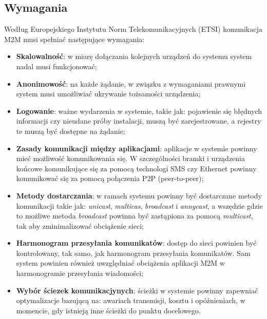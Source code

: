 \documentclass[12pt, a4paper, twoside]{report}
\begin{document}
\subsection{Wymagania}
\hspace{1cm}Według Europejskiego Instytutu Norm Telekomunikacyjnych (ETSI) komunikacja M2M musi spełniać następujące wymagania:
\begin{itemize}
  \item \textbf{Skalowalność}: w miarę dołączania kolejnych urządzeń do systemu system nadal musi funkcjonować;
  \item \textbf{Anonimowość}: na każde żądanie, w związku z wymaganiami prawnymi system musi umożliwiać ukrywanie tożsamości urządzenia;
  \item \textbf{Logowanie}: ważne wydarzenia w systemie, takie jak: pojawienie się błędnych informacji czy nieudane próby instalacji, muszą być zarejestrowane, a rejestry te muszą być dostępne na żądanie;
  \item \textbf{Zasady komunikacji między aplikacjami}: aplikacje w systemie powinny mieć możliwość komunikowania się. W szczególności bramki i urządzenia końcowe komunikujące się za pomocą technologi SMS czy Ethernet powinny komunikować
  się za pomocą połączenia P2P (peer-to-peer);
  \item  \textbf{Metody dostarczania}: w ramach systemu powinny być dostarczane metody komunikacji takie jak: \emph{unicast}, \emph{multicas}, \emph{broadcast} i \emph{annycast}, a wszędzie gdzie to możliwe metoda \emph{broadcast} powinna być zastąpiona za pomocą \emph{multicast}, tak aby zminimalizować obciążenie sieci;
  \item \textbf{Harmonogram przesyłania komunikatów}:  dostęp do sieci powinien być kontrolowany, tak samo, jak harmonogram przesyłania komunikatów. Sam system powinien również uwzględniać obciążenia aplikacji M2M w harmonogramie przesyłania wiadomości;
  \item \textbf{Wybór ściezek komunikacjynych}: ścieżki w systemie powinny zapewniać optymalizacje bazującą na: awariach transmisji, kosztu i opóźnieniach, w momencie, gdy istnieją inne ścieżki do punktu docelowego. \cite{m2m-web}
\end{itemize}
\end{document}
